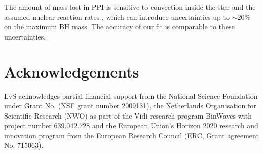 \documentclass[twocolumn]{aastex63}
\begin{document}


The amount of mass lost in PPI is sensitive to convection inside the star
\citep{renzo:20conv} and the assumed nuclear reaction rates \citep{farmer:19,
  farmer:20, costa:21, woosley:21, mehta:21}, which can introduce
  uncertainties up to $\sim{}20\%$ on the maximum BH mass. The accuracy
of our fit is comparable to these uncertainties.

\vspace*{10pt}
\section*{Acknowledgements}
LvS acknowledges partial financial support from the  National Science Foundation under Grant No. (NSF grant number 2009131),
the Netherlands Organisation for Scientific Research (NWO) as part of the Vidi research program BinWaves with project number 639.042.728
and the European Union’s Horizon 2020 research and innovation program from the European Research Council (ERC, Grant agreement No. 715063).


\newpage

\end{document}
